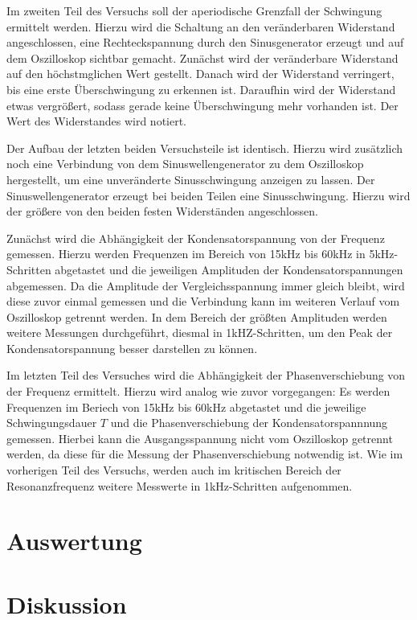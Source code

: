 Im zweiten Teil des Versuchs soll der aperiodische Grenzfall der Schwingung ermittelt werden. Hierzu wird die Schaltung
an den veränderbaren Widerstand angeschlossen, eine Rechteckspannung durch den Sinusgenerator erzeugt und auf dem
Oszilloskop sichtbar gemacht. Zunächst wird der veränderbare Widerstand auf den höchstmglichen Wert gestellt. Danach
wird der Widerstand verringert, bis eine erste Überschwingung zu erkennen ist. Daraufhin wird der Widerstand
etwas vergrößert, sodass gerade keine Überschwingung mehr vorhanden ist. Der Wert des Widerstandes wird notiert.

Der Aufbau der letzten beiden Versuchsteile ist identisch. Hierzu wird zusätzlich noch eine Verbindung von dem Sinuswellengenerator
zu dem Oszilloskop hergestellt, um eine unveränderte Sinusschwingung anzeigen zu lassen. Der Sinuswellengenerator erzeugt
bei beiden Teilen eine Sinusschwingung. Hierzu wird der größere von den beiden festen Widerständen angeschlossen.

Zunächst wird die Abhängigkeit der Kondensatorspannung von der Frequenz gemessen. Hierzu werden Frequenzen im Bereich
von 15kHz bis 60kHz in 5kHz-Schritten abgetastet und die jeweiligen Amplituden der Kondensatorspannungen abgemessen.
Da die Amplitude der Vergleichsspannung immer gleich bleibt, wird diese zuvor einmal gemessen und die Verbindung
kann im weiteren Verlauf vom Oszilloskop getrennt werden.
In dem Bereich der größten Amplituden werden weitere Messungen durchgeführt, diesmal in 1kHZ-Schritten, um den Peak
der Kondensatorspannung besser darstellen zu können.

Im letzten Teil des Versuches wird die Abhängigkeit der Phasenverschiebung von der Frequenz ermittelt.
Hierzu wird analog wie zuvor vorgegangen: Es werden Frequenzen im Beriech von 15kHz bis 60kHz abgetastet und die jeweilige
Schwingungsdauer $T$ und die Phasenverschiebung der Kondensatorspannnung gemessen. Hierbei kann die Ausgangsspannung nicht
vom Oszilloskop getrennt werden, da diese für die Messung der Phasenverschiebung notwendig ist. Wie im vorherigen Teil
des Versuchs, werden auch im kritischen Bereich der Resonanzfrequenz weitere Messwerte in 1kHz-Schritten aufgenommen.

\section{Auswertung}

\section{Diskussion}
